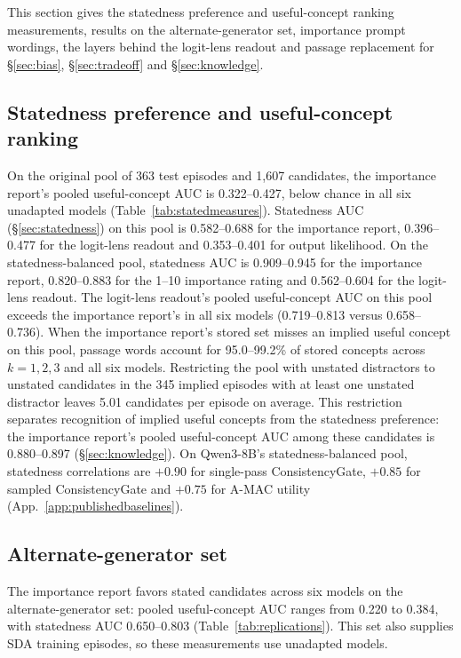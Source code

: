 This section gives the statedness preference and useful-concept ranking measurements, results on the alternate-generator set, importance prompt wordings, the layers behind the logit-lens readout and passage replacement for \S\ref{sec:bias}, \S\ref{sec:tradeoff} and \S\ref{sec:knowledge}.

\subsection{Statedness preference and useful-concept ranking}
\label{app:statedmeasures}
\label{app:withinprovenance}

On the original pool of 363 test episodes and 1,607 candidates, the importance report's pooled useful-concept AUC is 0.322--0.427, below chance in all six unadapted models (Table~\ref{tab:statedmeasures}). Statedness AUC (\S\ref{sec:statedness}) on this pool is 0.582--0.688 for the importance report, 0.396--0.477 for the logit-lens readout and 0.353--0.401 for output likelihood. On the statedness-balanced pool, statedness AUC is 0.909--0.945 for the importance report, 0.820--0.883 for the 1--10 importance rating and 0.562--0.604 for the logit-lens readout. The logit-lens readout's pooled useful-concept AUC on this pool exceeds the importance report's in all six models (0.719--0.813 versus 0.658--0.736). When the importance report's stored set misses an implied useful concept on this pool, passage words account for 95.0--99.2\% of stored concepts across $k=1,2,3$ and all six models. Restricting the pool with unstated distractors to unstated candidates in the 345 implied episodes with at least one unstated distractor leaves 5.01 candidates per episode on average. This restriction separates recognition of implied useful concepts from the statedness preference: the importance report's pooled useful-concept AUC among these candidates is 0.880--0.897 (\S\ref{sec:knowledge}). On Qwen3-8B's statedness-balanced pool, statedness correlations are $+0.90$ for single-pass ConsistencyGate, $+0.85$ for sampled ConsistencyGate and $+0.75$ for A-MAC utility (App.~\ref{app:publishedbaselines}).




\subsection{Alternate-generator set}
\label{app:replications}

The importance report favors stated candidates across six models on the alternate-generator set: pooled useful-concept AUC ranges from 0.220 to 0.384, with statedness AUC 0.650--0.803 (Table~\ref{tab:replications}).
This set also supplies SDA training episodes, so these measurements use unadapted models.



